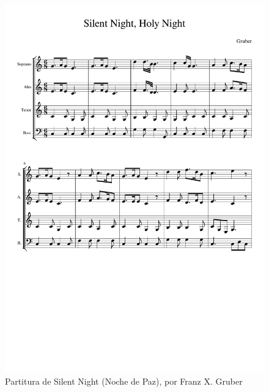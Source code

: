      \begin{figure}
     	\centering
     	\includegraphics[width=0.8\linewidth]{imagenes/scores/silent_night.pdf}
     	\caption{Partitura de Silent Night (Noche de Paz), por Franz X. Gruber}
     	\label{fig:silent_score}
     \end{figure}
     
